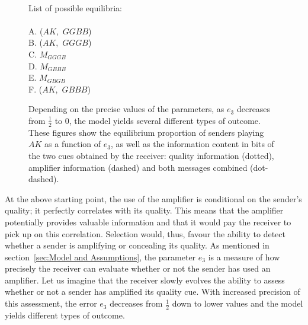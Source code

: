 \documentclass[a4paper,12pt]{article}
\numberwithin{equation}{section}
\begin{document}
\begin{figure}[h]
\captionsetup{width=440pt}
\hfill
{}\\
\hfill
\begin{minipage}[t]{.45\textwidth}
\vspace{-45mm}
List of possible equilibria:\\
\\
A. ($AK$,~$GGBB$)\\
B. ($AK$,~$GGGB$)\\
C. $M_{GGGB}$\\
D. $M_{GBBB}$\\
E. $M_{GBGB}$\\
F. ($AK$,~$GBBB$)\\
\end{minipage}
\caption{Depending on the precise values of the parameters, as $e_{3}$ decreases from $\frac{1}{2}$ to $0$, the model yields several different types of outcome. These figures show the equilibrium proportion of senders playing $AK$ as a function of $e_{3}$, as well as the information content in bits of the two cues obtained by the receiver: quality information (dotted), amplifier information (dashed) and both messages combined (dot-dashed).}
\label{fig:Figure 8910}
\end{figure}

\vspace{-1mm}

At the above starting point, the use of the amplifier is conditional on the sender's quality; it perfectly correlates with its quality. This means that the amplifier potentially provides valuable information and that it would pay the receiver to pick up on this correlation. Selection would, thus, favour the ability to detect whether a sender is amplifying or concealing its quality. As mentioned in section~\ref{sec:Model and Assumptions}, the parameter $e_{3}$ is a measure of how precisely the receiver can evaluate whether or not the sender has used an amplifier. Let us imagine that the receiver slowly evolves the ability to assess whether or not a sender has amplified its quality cue. With increased precision of this assessment, the error $e_{3}$ decreases from $\frac{1}{2}$ down to lower values and the model yields different types of outcome.
\end{document}
